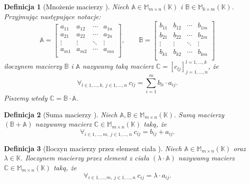 \documentclass[12pt,a4paper]{report}
\newtheorem{df}{Definicja}[chapter]
\newcommand{\setK}{\mathbb{K}}
\begin{document}
\begin{df}[Mnożenie macierzy {\citep[Sec 9.3 Def 9.13]{alzega}}]
Niech $\mathbb{A} \in \mathbb{M}_{m \times n} (\setK)$ i $\mathbb{B} \in \mathbb{M}_{k \times m} (\setK)$. Przyjmując następujące notacje:
$$
\mathbb{A} = \left[
        \begin{array}{cccc}
         a_{11} & a_{12} & \cdots & a_{1n} \\
         a_{21} & a_{22} & \cdots & a_{2n} \\
         \vdots & \vdots & \ddots & \vdots \\
         a_{m1} & a_{m2} & \cdots & a_{mn} \\
         \end{array}
      \right],
      \qquad
\mathbb{B} = \left[
        \begin{array}{cccc}
         b_{11} & b_{12} & \cdots & b_{1m} \\
         b_{21} & b_{22} & \cdots & b_{2m} \\
         \vdots & \vdots & \ddots & \vdots \\
         b_{k1} & b_{k2} & \cdots & b_{km} \\
         \end{array}
      \right]
$$
iloczynem macierzy $\mathbb{B}$ i $\mathbb{A}$ nazywamy taką macierz $\mathbb{C} = [c_{lj}]_{j = 1, \ldots, n}^{l = 1, \ldots , k}$, że
$$
\forall_{l \in 1, \ldots, k, \: j \in 1, \ldots, n} \:c_{lj} = \sum_{i=1}^m b_{li} \cdot a_{ij}.
$$
Piszemy wtedy $\mathbb{C} = \mathbb{B} \cdot \mathbb{A}$.
\end{df}

\begin{df}[Suma macierzy {\citep[Sec 8.1]{alzega}}]
Niech $\mathbb{A}, \mathbb{B} \in \mathbb{M}_{m \times n} (\setK)$.
Sumą macierzy $(\mathbb{B} + \mathbb{A})$ nazywamy macierz $\mathbb{C} \in \mathbb{M}_{m \times n} (\setK)$ taką, że
$$
\forall_{i \in 1, \ldots, m, \: j \in 1, \ldots, n} \: c_{ij} = b_{ij} + a_{ij}.
$$
\end{df}

\begin{df}[Iloczyn macierzy przez element ciała {\citep[Sec 8.1]{alzega}}]
Niech $\mathbb{A} \in \mathbb{M}_{m \times n} (\setK)$ oraz $\lambda \in \setK$.
Iloczynem macierzy przez element z ciała $(\lambda \cdot \mathbb{A})$ nazywamy macierz $\mathbb{C} \in \mathbb{M}_{m \times n} (\setK)$ taką, że
$$
\forall_{i \in 1, \ldots, m, \: j \in 1, \ldots, n} \: c_{ij} = \lambda \cdot a_{ij}.
$$
\end{df}
\end{document}
